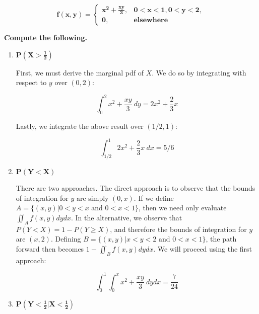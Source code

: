 \documentclass[10pt, oneside]{article}   	%
\theoremstyle{definition}
\begin{document}
\begin{enumerate}[label=6.\arabic*]
\begin{tcolorbox}[
  colback=Cerulean!5!white,
  colframe=Cerulean!75!black]
\[ \bm{f(x,y) = } \begin{cases} \bm{x^2 + \frac{xy}{3},} & \bm{0 < x < 1, 0 < y < 2,} \\
\bm{0}, & \textbf{elsewhere}
\end{cases} \]

\textbf{Compute the following.}
\end{tcolorbox}

	\begin{enumerate}
	\item  \begin{tcolorbox}[
	  colback=Cerulean!5!white,
	  colframe=Cerulean!75!black]
	\textbf{$\bm{ P(X > \frac{1}{2} ) } $ }
	\end{tcolorbox}
	
	First, we must derive the marginal pdf of $X$. We do so by integrating with respect to $y$ over $(0, 2)$:
	
	\[ \int^2_0 x^2 + \frac{xy}{3} \ dy = 2x^2 + \frac{2}{3} x \]
	
	Lastly, we integrate the above result over $(1/2, 1)$:
	
	\[ \int^1_{1/2} 2x^2 + \frac{2}{3} x \ dx = \boxed{5/6} \]
	
	\item  \begin{tcolorbox}[
	  colback=Cerulean!5!white,
	  colframe=Cerulean!75!black]
	\textbf{$\bm{ P(Y < X ) } $ }
	\end{tcolorbox}
	
	There are two approaches. The direct approach is to observe that the bounds of integration for $y$ are simply $(0, x)$. If we define $A = \{ (x, y) | 0 < y < x \text{ and } 0 < x < 1 \}$, then we need only evaluate $\iint_A f(x, y) dy dx$. In the alternative, we observe that $P(Y < X) = 1 - P(Y \geq X)$, and therefore the bounds of integration for $y$ are $(x, 2)$. Defining $B = \{ (x,y) | x < y < 2 \text{ and } 0 < x < 1 \}$, the path forward then becomes $1 - \iint_B f(x,y) dy dx$. We will proceed using the first approach:
	
	\[ \int^1_0 \int^x_0 x^2 + \frac{xy}{3} \ dy dx = \boxed{ \frac{7}{24} } \]
	
	\item  \begin{tcolorbox}[
	  colback=Cerulean!5!white,
	  colframe=Cerulean!75!black]
	\textbf{$\bm{ P(Y < \frac{1}{2} | X < \frac{1}{2} ) } $ }
	\end{tcolorbox}
	

\end{enumerate}
\end{enumerate}
\end{document}
